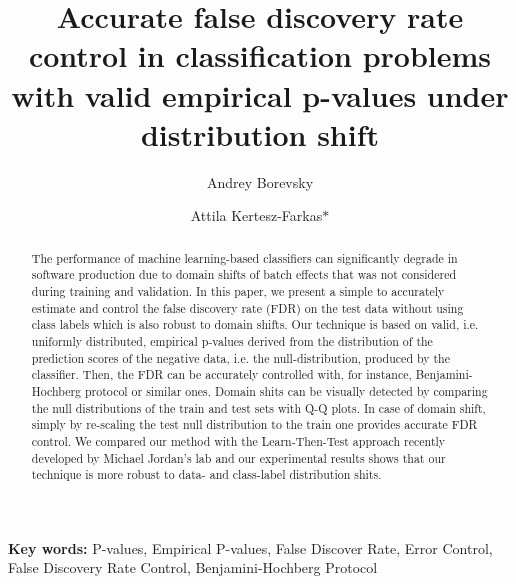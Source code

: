 \documentclass{article}
\author{Andrey Borevsky}
\author{Attila Kertesz-Farkas$\ast$}
\affil{Laboratory on AI for Computational Biology, Faculty of Computer Science, HSE University,  11 Pokrovsky Bvld., Moscow 109028, Russian Federation}
\title{Accurate false discovery rate control in classification problems with valid empirical p-values under distribution shift}
\begin{document}
\maketitle

\begin{abstract}
	The performance of machine learning-based classifiers can significantly degrade in software production due to domain shifts of batch effects that was not considered during training and validation. In this paper, we present a simple to accurately estimate and control the false discovery rate (FDR) on the test data without using class labels which is also robust to domain shifts. Our technique is based on valid, i.e. uniformly distributed, empirical p-values derived from the distribution of the prediction scores of the negative data, i.e. the null-distribution, produced by the classifier. Then, the FDR can be accurately controlled with, for instance, Benjamini-Hochberg protocol or similar ones. Domain shits can be visually detected by comparing the null distributions of the train and test sets with Q-Q plots. In case of domain shift, simply by re-scaling the test null distribution to the train one provides  accurate FDR control. We compared our method with the Learn-Then-Test approach recently developed by Michael Jordan's lab and our experimental results shows that our technique is more robust to data- and class-label distribution shits. 
	
	 


\end{abstract}
\textbf{Key words:} P-values, Empirical P-values, False Discover Rate, Error Control, False Discovery Rate Control, Benjamini-Hochberg Protocol
\end{document}
